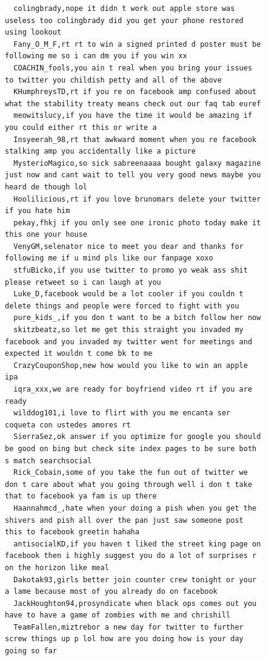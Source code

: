 \begin{figure}[htpb]
\begin{verbatim}
  colingbrady,nope it didn t work out apple store was useless too colingbrady did you get your phone restored using lookout
  Fany_O_M_F,rt rt to win a signed printed d poster must be following me so i can dm you if you win xx
  COACHIN_fools,you ain t real when you bring your issues to twitter you childish petty and all of the above
  KHumphreysTD,rt if you re on facebook amp confused about what the stability treaty means check out our faq tab euref
  meowitslucy,if you have the time it would be amazing if you could either rt this or write a
  Insyeerah_98,rt that awkward moment when you re facebook stalking amp you accidentally like a picture
  MysterioMagico,so sick sabreenaaaa bought galaxy magazine just now and cant wait to tell you very good news maybe you heard de though lol
  Hoolilicious,rt if you love brunomars delete your twitter if you hate him
  pekay,fhkj if you only see one ironic photo today make it this one your house
  VenyGM,selenator nice to meet you dear and thanks for following me if u mind pls like our fanpage xoxo
  stfuBicko,if you use twitter to promo yo weak ass shit please retweet so i can laugh at you
  Luke_D,facebook would be a lot cooler if you couldn t delete things and people were forced to fight with you
  pure_kids_,if you don t want to be a bitch follow her now
  skitzbeatz,so let me get this straight you invaded my facebook and you invaded my twitter went for meetings and expected it wouldn t come bk to me
  CrazyCouponShop,new how would you like to win an apple ipa
  iqra_xxx,we are ready for boyfriend video rt if you are ready
  wilddog101,i love to flirt with you me encanta ser coqueta con ustedes amores rt
  SierraSez,ok answer if you optimize for google you should be good on bing but check site index pages to be sure both s match searchsocial
  Rick_Cobain,some of you take the fun out of twitter we don t care about what you going through well i don t take that to facebook ya fam is up there
  Haannahmcd_,hate when your doing a pish when you get the shivers and pish all over the pan just saw someone post this to facebook greetin hahaha
  antisocialKD,if you haven t liked the street king page on facebook then i highly suggest you do a lot of surprises r on the horizon like meal
  Dakotak93,girls better join counter crew tonight or your a lame because most of you already do on facebook
  JackHoughton94,prosyndicate when black ops comes out you have to have a game of zombies with me and chrishill
  TeamFallen,miztrebor a new day for twitter to further screw things up p lol how are you doing how is your day going so far

\end{verbatim}
\end{figure}

